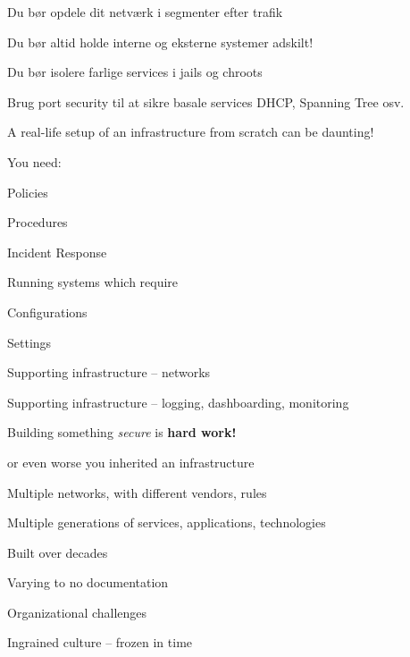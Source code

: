 \documentclass[Screen16to9,17pt]{foils}
\begin{document}


\begin{list1}
\item Du bør opdele dit netværk i segmenter efter trafik
\item Du bør altid holde interne og eksterne systemer adskilt!
\item Du bør isolere farlige services i jails og chroots
\item Brug port security til at sikre basale services DHCP, Spanning Tree osv.
\end{list1}




\begin{list1}
\item A real-life setup of an infrastructure from scratch can be daunting!
\item You need:
\begin{list2}
\item Policies
\item Procedures
\item Incident Response
\end{list2}
\item Running systems which require
\begin{list2}
\item Configurations
\item Settings
\item Supporting infrastructure -- networks
\item Supporting infrastructure -- logging, dashboarding, monitoring
\end{list2}
\item Building something \emph{secure} is {\bf hard work!}
\end{list1}




\begin{list1}
\item or even worse you inherited an infrastructure
\item Multiple networks, with different vendors, rules
\item Multiple generations of services, applications, technologies
\item Built over decades
\item Varying to no documentation
\item Organizational challenges
\item Ingrained culture -- frozen in time
\end{list1}
\end{document}
